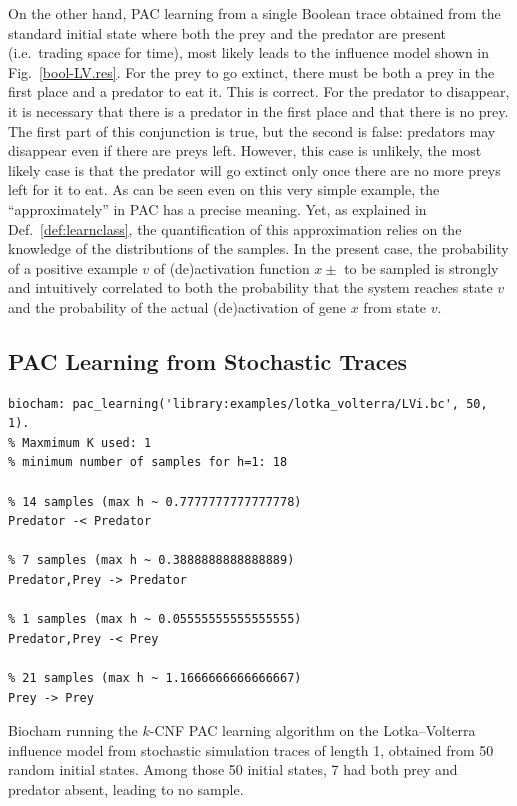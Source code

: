 \documentclass{llncs}
\begin{document}
On the other hand, PAC learning from a single Boolean trace obtained from the standard initial state where both the prey and the predator are present (i.e.~trading space for time),
most likely leads to the influence model shown in Fig.~\ref{bool-LV.res}.
For the prey to go extinct, there must be both a prey in the first place and a predator to eat it. This is correct.
For the predator to disappear, it is necessary that there is a predator in the first place and that there is no prey. 
The first part of this conjunction is true, but the second is false: predators may disappear even if there are preys left.
However, this case is unlikely, the most likely case is that the predator will go extinct only once there are no more preys left for it to eat. 
As can be seen even on this very simple example, the ``approximately'' in PAC has a precise meaning. Yet, as explained in Def.~\ref{def:learnclass}, the quantification of this approximation relies on the knowledge of the distributions of the samples.
%
In the present case, the probability of a positive example $v$ of (de)activation function $x\pm$ to be sampled is strongly and intuitively correlated to both the probability that the system reaches state $v$ and the probability of the actual (de)activation of gene $x$ from state $v$. 


\subsection{PAC Learning from  Stochastic Traces}


\begin{listfig}[htb]
      \begin{lstlisting}
biocham: pac_learning('library:examples/lotka_volterra/LVi.bc', 50, 1).
% Maxmimum K used: 1
% minimum number of samples for h=1: 18

% 14 samples (max h ~ 0.7777777777777778)
Predator -< Predator

% 7 samples (max h ~ 0.3888888888888889)
Predator,Prey -> Predator

% 1 samples (max h ~ 0.05555555555555555)
Predator,Prey -< Prey

% 21 samples (max h ~ 1.1666666666666667)
Prey -> Prey
   \end{lstlisting}
   \caption{Biocham running the $k$-CNF PAC learning algorithm on the Lotka--Volterra
      influence model from stochastic simulation traces of length 1, obtained from 50 random initial states.
Among those 50 initial
     states, 7 had both prey and predator absent, leading to no sample.}\label{lst:stoch_lv}
\end{listfig}
\end{document}

